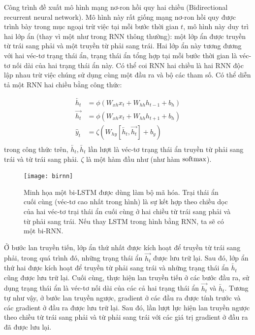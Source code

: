 Công trình \cite{schuster1997} đề xuất mô hình mạng nơ-ron hồi quy hai chiều (Bidirectional recurrent neural network). Mô hình này rất giống mạng nơ-ron hồi quy được trình bày trong mục \cite{rnnsection} ngoại trừ việc tại mỗi bước thời gian $t$, mô hình này duy trì hai lớp ẩn (thay vì một như trong RNN thông thường): một lớp ẩn được truyền từ trái sang phải và một truyền từ phải sang trái. Hai lớp ẩn này tương đương với hai véc-tơ trạng thái ẩn, trạng thái ẩn tổng hợp tại mỗi bước thời gian là véc-tơ nối dài của hai trạng thái ẩn này. Có thể coi RNN hai chiều là hai RNN độc lập nhau trừ việc chúng sử dụng cùng một đầu ra và bộ các tham số. Có thể diễn tả một RNN hai chiều bằng công thức:

\begin{align}
	\overleftarrow{h_t} &= \phi \left(W_{xh} x_{t} + W_{hh} h_{t-1} + b_h \right) \\ \label{birnn1} 
    \overrightarrow{h_t} &= \phi \left(W_{xh} x_{t} + W_{hh} h_{t+1} + b_h \right) \\ \label{birnn2}
    \hat{y}_t &= \zeta \left(W_{hy} \left[\overleftarrow{h_t}, \overrightarrow{h_t} \right] + b_y \right) \\ \label{birnn3}	 \nonumber
\end{align}
trong công thức trên, $\overleftarrow{h_t}, \overleftarrow{h_t}$ lần lượt là véc-tơ trạng thái ẩn truyền từ phải sang trái và từ trái sang phải. $\zeta$ là một hàm đầu như (như hàm $\mathrm{softmax}$).

\begin{figure}
	\centering
	\texttt{[image: birnn]}
	\caption[Minh họa một bi-LSTM được dùng làm bộ mã hóa]{Minh họa một bi-LSTM được dùng làm bộ mã hóa. Trại thái ẩn cuối cùng (véc-tơ cao nhất trong hình) là sự kết hợp theo chiều dọc của hai véc-tơ trại thái ẩn cuối cùng ở hai chiều từ trái sang phải và từ phải sang trái. Nếu thay LSTM trong hình bằng RNN, ta sẽ có một bi-RNN.}
	\label{fig_birnn}
\end{figure}

Ở bước lan truyền tiến, lớp ẩn thứ nhất được kích hoạt để truyền từ trái sang phải, trong quá trình đó, những trạng thái ẩn $\overrightarrow{h_t}$ được lưu trữ lại. Sau đó, lớp ẩn thứ hai được kích hoạt để truyền từ phải sang trái và những trạng thái ẩn $\overleftarrow{h_t}$ cũng được lưu trữ lại. Cuối cùng, thực hiện lan truyền tiến ở các bước đầu ra, sử dụng trạng thái ẩn là véc-tơ nối dài của các cả hai trạng thái ẩn $\overrightarrow{h_t}$ và $\overleftarrow{h_t}$. Tương tự như vậy, ở bước lan truyền ngược, gradient ở các đầu ra được tính trước và các gradient ở đầu ra được lưu trữ lại. Sau đó, lần lượt lực hiện lan truyền ngược theo chiều từ trái sang phải và từ phải sang trái với các giá trị gradient ở đầu ra đã được lưu lại.

